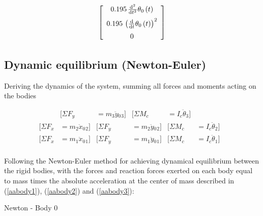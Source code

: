 \begin{equation}\label{newaabodyAA3}
 \left[ \begin {array}{c}  0.195\,{\frac {{\rm d}^{2}}{{\rm d}{t}^{2}}
}\theta_{{0}} \left( t \right) \\ \noalign{\medskip} 0.195\, \left( {
\frac {\rm d}{{\rm d}t}}\theta_{{0}} \left( t \right)  \right) ^{2}
\\ \noalign{\medskip}0\end {array} \right] 
\end{equation}


\subsection{Dynamic equilibrium (Newton-Euler)}

Deriving the dynamics of the system, summing all forces and moments acting on the bodies

\begin{align*}
[\Sigma{F}_{x}&={m_3}\ddot{x}{_0}{_3}] & [\Sigma{F}_{y}&={m_3}\ddot{y}{_0}{_3}] & [\Sigma{M}_{c}&={I_c}\ddot{\theta}{_3}]& \\
[\Sigma{F}_{x}&={m_2}\ddot{x}{_0}{_2}] & [\Sigma{F}_{y}&={m_2}\ddot{y}{_0}{_2}]& [\Sigma{M}_{c}&={I_c}\ddot{\theta}{_2}]&\\
[\Sigma{F}_{x}&={m_1}\ddot{x}{_0}{_1}] & [\Sigma{F}_{y}&={m_1}\ddot{y}{_0}{_1}]& [\Sigma{M}_{c}&={I_c}\ddot{\theta}{_1}]&\\
\end{align*}

Following the Newton-Euler method for achieving dynamical equilibrium between the rigid bodies, with the forces and reaction forces exerted on each body equal to mass times the absolute acceleration at the center of mass described in (\ref{aabody1}), (\ref{aabody2}) and (\ref{aabody3}):   

Newton - Body 0

